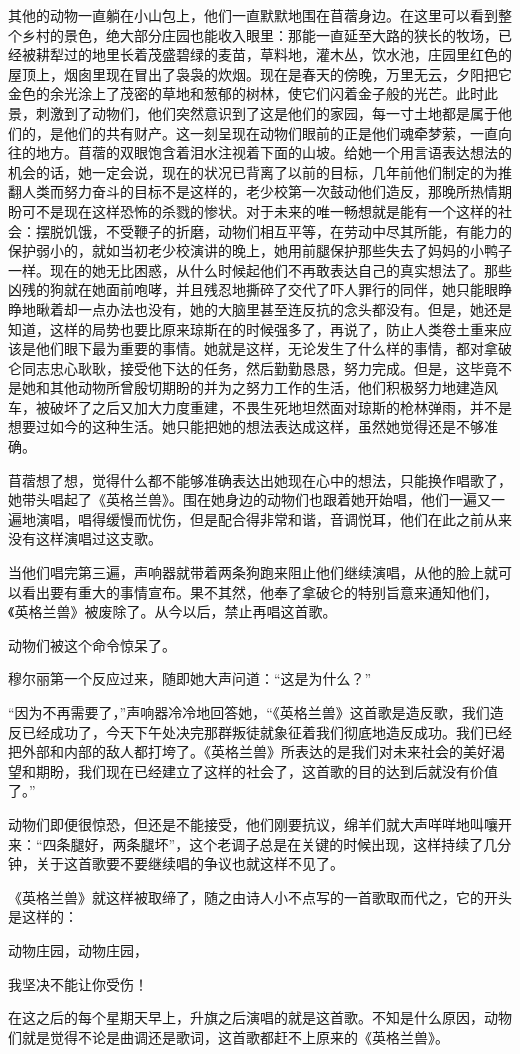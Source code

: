 其他的动物一直躺在小山包上，他们一直默默地围在苜蓿身边。在这里可以看到整个乡村的景色，绝大部分庄园也能收入眼里：那能一直延至大路的狭长的牧场，已经被耕犁过的地里长着茂盛碧绿的麦苗，草料地，灌木丛，饮水池，庄园里红色的屋顶上，烟囱里现在冒出了袅袅的炊烟。现在是春天的傍晚，万里无云，夕阳把它金色的余光涂上了茂密的草地和葱郁的树林，使它们闪着金子般的光芒。此时此景，刺激到了动物们，他们突然意识到了这是他们的家园，每一寸土地都是属于他们的，是他们的共有财产。这一刻呈现在动物们眼前的正是他们魂牵梦萦，一直向往的地方。苜蓿的双眼饱含着泪水注视着下面的山坡。给她一个用言语表达想法的机会的话，她一定会说，现在的状况已背离了以前的目标，几年前他们制定的为推翻人类而努力奋斗的目标不是这样的，老少校第一次鼓动他们造反，那晚所热情期盼可不是现在这样恐怖的杀戮的惨状。对于未来的唯一畅想就是能有一个这样的社会：摆脱饥饿，不受鞭子的折磨，动物们相互平等，在劳动中尽其所能，有能力的保护弱小的，就如当初老少校演讲的晚上，她用前腿保护那些失去了妈妈的小鸭子一样。现在的她无比困惑，从什么时候起他们不再敢表达自己的真实想法了。那些凶残的狗就在她面前咆哮，并且残忍地撕碎了交代了吓人罪行的同伴，她只能眼睁睁地瞅着却一点办法也没有，她的大脑里甚至连反抗的念头都没有。但是，她还是知道，这样的局势也要比原来琼斯在的时候强多了，再说了，防止人类卷土重来应该是他们眼下最为重要的事情。她就是这样，无论发生了什么样的事情，都对拿破仑同志忠心耿耿，接受他下达的任务，然后勤勤恳恳，努力完成。但是，这毕竟不是她和其他动物所曾殷切期盼的并为之努力工作的生活，他们积极努力地建造风车，被破坏了之后又加大力度重建，不畏生死地坦然面对琼斯的枪林弹雨，并不是想要过如今的这种生活。她只能把她的想法表达成这样，虽然她觉得还是不够准确。

苜蓿想了想，觉得什么都不能够准确表达出她现在心中的想法，只能换作唱歌了，她带头唱起了《英格兰兽》。围在她身边的动物们也跟着她开始唱，他们一遍又一遍地演唱，唱得缓慢而忧伤，但是配合得非常和谐，音调悦耳，他们在此之前从来没有这样演唱过这支歌。

当他们唱完第三遍，声响器就带着两条狗跑来阻止他们继续演唱，从他的脸上就可以看出要有重大的事情宣布。果不其然，他奉了拿破仑的特别旨意来通知他们，《英格兰兽》被废除了。从今以后，禁止再唱这首歌。

动物们被这个命令惊呆了。

穆尔丽第一个反应过来，随即她大声问道：“这是为什么？”

“因为不再需要了，”声响器冷冷地回答她，“《英格兰兽》这首歌是造反歌，我们造反已经成功了，今天下午处决完那群叛徒就象征着我们彻底地造反成功。我们已经把外部和内部的敌人都打垮了。《英格兰兽》所表达的是我们对未来社会的美好渴望和期盼，我们现在已经建立了这样的社会了，这首歌的目的达到后就没有价值了。”

动物们即便很惊恐，但还是不能接受，他们刚要抗议，绵羊们就大声咩咩地叫嚷开来：“四条腿好，两条腿坏”，这个老调子总是在关键的时候出现，这样持续了几分钟，关于这首歌要不要继续唱的争议也就这样不见了。

《英格兰兽》就这样被取缔了，随之由诗人小不点写的一首歌取而代之，它的开头是这样的：

动物庄园，动物庄园，

我坚决不能让你受伤！

在这之后的每个星期天早上，升旗之后演唱的就是这首歌。不知是什么原因，动物们就是觉得不论是曲调还是歌词，这首歌都赶不上原来的《英格兰兽》。
